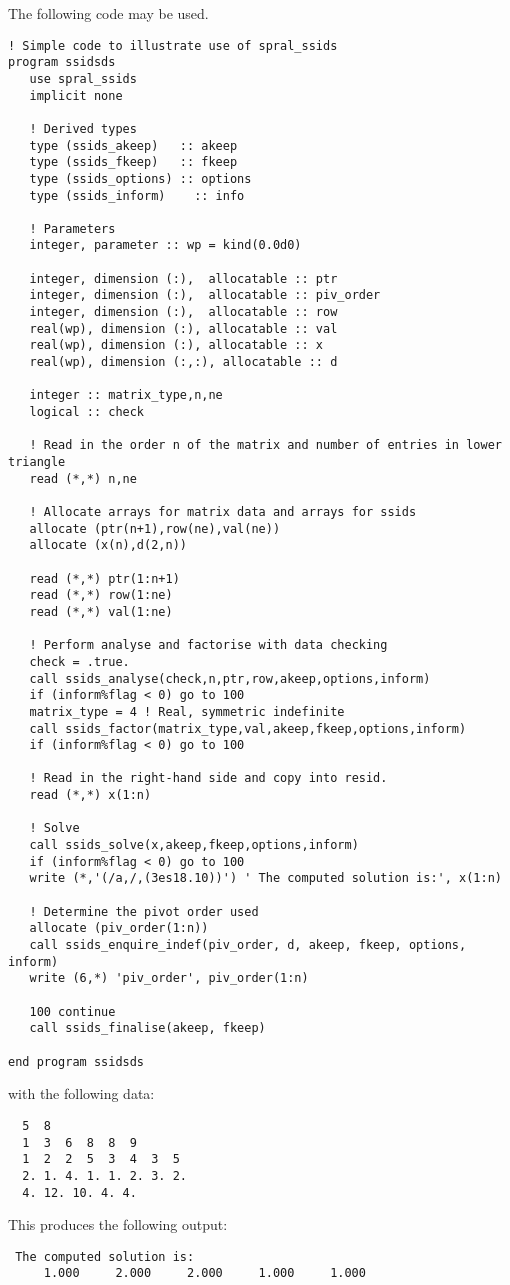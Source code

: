 \documentclass{spral}
\begin{document}
\noindent
The following code may be used.
\begin{verbatim}
! Simple code to illustrate use of spral_ssids
program ssidsds
   use spral_ssids
   implicit none

   ! Derived types
   type (ssids_akeep)   :: akeep
   type (ssids_fkeep)   :: fkeep
   type (ssids_options) :: options
   type (ssids_inform)    :: info

   ! Parameters
   integer, parameter :: wp = kind(0.0d0)

   integer, dimension (:),  allocatable :: ptr
   integer, dimension (:),  allocatable :: piv_order
   integer, dimension (:),  allocatable :: row
   real(wp), dimension (:), allocatable :: val
   real(wp), dimension (:), allocatable :: x
   real(wp), dimension (:,:), allocatable :: d

   integer :: matrix_type,n,ne
   logical :: check

   ! Read in the order n of the matrix and number of entries in lower triangle
   read (*,*) n,ne

   ! Allocate arrays for matrix data and arrays for ssids
   allocate (ptr(n+1),row(ne),val(ne))
   allocate (x(n),d(2,n))

   read (*,*) ptr(1:n+1)
   read (*,*) row(1:ne)
   read (*,*) val(1:ne)

   ! Perform analyse and factorise with data checking
   check = .true.
   call ssids_analyse(check,n,ptr,row,akeep,options,inform)
   if (inform%flag < 0) go to 100
   matrix_type = 4 ! Real, symmetric indefinite
   call ssids_factor(matrix_type,val,akeep,fkeep,options,inform)
   if (inform%flag < 0) go to 100

   ! Read in the right-hand side and copy into resid.
   read (*,*) x(1:n)

   ! Solve
   call ssids_solve(x,akeep,fkeep,options,inform)
   if (inform%flag < 0) go to 100
   write (*,'(/a,/,(3es18.10))') ' The computed solution is:', x(1:n)

   ! Determine the pivot order used
   allocate (piv_order(1:n))
   call ssids_enquire_indef(piv_order, d, akeep, fkeep, options, inform)
   write (6,*) 'piv_order', piv_order(1:n)

   100 continue
   call ssids_finalise(akeep, fkeep)

end program ssidsds
\end{verbatim}
\noindent
with the following data:
\begin{verbatim}
  5  8
  1  3  6  8  8  9
  1  2  2  5  3  4  3  5
  2. 1. 4. 1. 1. 2. 3. 2.
  4. 12. 10. 4. 4.
\end{verbatim}
\noindent
This produces the following output:
\begin{verbatim}
 The computed solution is:
     1.000     2.000     2.000     1.000     1.000
\end{verbatim}
\end{document}
